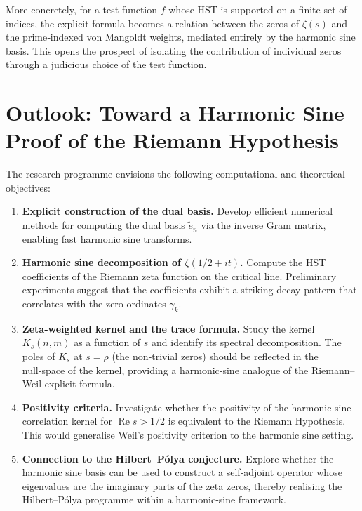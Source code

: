 \documentclass[11pt,a4paper]{article}
\begin{document}
More concretely, for a test function $f$ whose HST is supported on a finite set of indices, the explicit formula becomes a relation between the zeros of $\zeta(s)$ and the prime‑indexed von Mangoldt weights, mediated entirely by the harmonic sine basis. This opens the prospect of isolating the contribution of individual zeros through a judicious choice of the test function.

\section{Outlook: Toward a Harmonic Sine Proof of the Riemann Hypothesis}
The research programme envisions the following computational and theoretical objectives:

\begin{enumerate}[start=1]
\item \textbf{Explicit construction of the dual basis.} Develop efficient numerical methods for computing the dual basis $\tilde{e}_n$ via the inverse Gram matrix, enabling fast harmonic sine transforms.

\item \textbf{Harmonic sine decomposition of $\zeta(1/2+it)$.} Compute the HST coefficients of the Riemann zeta function on the critical line. Preliminary experiments suggest that the coefficients exhibit a striking decay pattern that correlates with the zero ordinates $\gamma_k$.

\item \textbf{Zeta‑weighted kernel and the trace formula.} Study the kernel $K_s(n,m)$ as a function of $s$ and identify its spectral decomposition. The poles of $K_s$ at $s = \rho$ (the non‑trivial zeros) should be reflected in the null‑space of the kernel, providing a harmonic‑sine analogue of the Riemann–Weil explicit formula.

\item \textbf{Positivity criteria.} Investigate whether the positivity of the harmonic sine correlation kernel for $\operatorname{Re} s > 1/2$ is equivalent to the Riemann Hypothesis. This would generalise Weil’s positivity criterion to the harmonic sine setting.

\item \textbf{Connection to the Hilbert–Pólya conjecture.} Explore whether the harmonic sine basis can be used to construct a self‑adjoint operator whose eigenvalues are the imaginary parts of the zeta zeros, thereby realising the Hilbert–Pólya programme within a harmonic‑sine framework.
\end{enumerate}
\end{document}
